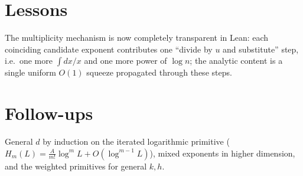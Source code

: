 \documentclass[11pt]{article}
\begin{document}
\section{Lessons}
The multiplicity mechanism is now completely transparent in Lean: each coinciding candidate exponent
contributes one ``divide by $u$ and substitute'' step, i.e.\ one more $\int dx/x$ and one more power of
$\log n$; the analytic content is a single uniform $O(1)$ squeeze propagated through these steps.

\section{Follow-ups}
General $d$ by induction on the iterated logarithmic primitive ($H_m(L)=\tfrac{A}{m!}\log^mL+O(\log^{m-1}L)$),
mixed exponents in higher dimension, and the weighted primitives for general $k,h$.
\end{document}
